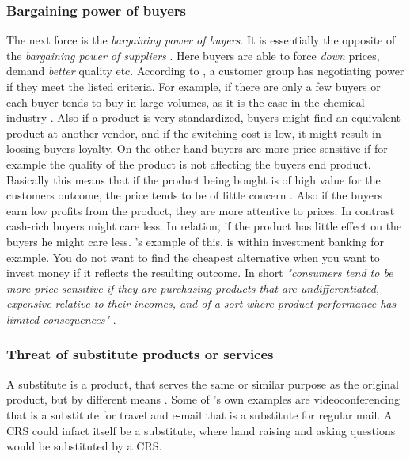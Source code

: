 \subsubsection*{Bargaining power of buyers}
The next force is the \emph{bargaining power of buyers}. It is essentially the opposite of the \emph{bargaining power of suppliers} \cite[p.~83]{porter2008five}. Here buyers are able to force \emph{down} prices, demand \emph{better} quality etc. According to , a customer group has negotiating power if they meet the listed criteria. For example, if there are only a few buyers or each buyer tends to buy in large volumes, as it is the case in the chemical industry \cite[p.~83]{porter2008five}. Also if a product is very standardized, buyers might find an equivalent product at another vendor, and if the switching cost is low, it might result in loosing buyers loyalty. 
On the other hand buyers are more price sensitive if for example the quality of the product is not affecting the buyers end product. Basically this means that if the product being bought is of high value for the customers outcome, the price tends to be of little concern \cite[p.~84]{porter2008five}. Also if the buyers earn low profits from the product, they are more attentive to prices. In contrast cash-rich buyers might care less. In relation, if the product has little effect on the buyers he might care less. 's example of this, is within investment banking for example. You do not want to find the cheapest alternative when you want to invest money if it reflects the resulting outcome. In short \emph{"consumers tend to be more price sensitive if they are purchasing products that are undifferentiated, expensive relative to their incomes, and of a sort where product performance has limited consequences"} \cite[p.~84]{porter2008five}.

\subsubsection*{Threat of substitute products or services}
A substitute is a product, that serves the same or similar purpose as the original product, but by different means \cite[p.~84]{porter2008five}. Some of 's own examples are videoconferencing that is a substitute for travel and e-mail that is a substitute for regular mail. A CRS could infact itself be a substitute, where hand raising and asking questions would be substituted by a CRS. 


